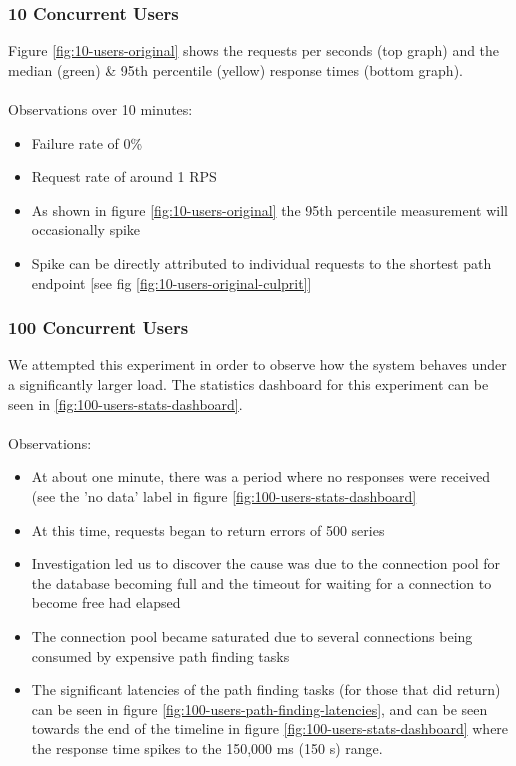 \subsubsection{10 Concurrent Users}
Figure \ref{fig:10-users-original} shows the requests per seconds (top graph) and the median (green) \& 95th percentile (yellow) response times (bottom graph). 
\\\\
Observations over 10 minutes:
\begin{itemize}
    \item Failure rate of 0\%
    \item Request rate of around 1 RPS
    \item As shown in figure \ref{fig:10-users-original} the 95th percentile measurement will occasionally spike
    \item Spike can be directly attributed to individual requests to the shortest path endpoint [see fig \ref{fig:10-users-original-culprit}]
\end{itemize}

\subsubsection{100 Concurrent Users}
We attempted this experiment in order to observe how the system behaves under a significantly larger load. The statistics dashboard for this experiment can be seen in \ref{fig:100-users-stats-dashboard}. 
\\\\
Observations:
\begin{itemize}
    \item At about one minute, there was a period where no responses were received (see the 'no data' label in figure \ref{fig:100-users-stats-dashboard}
    \item At this time, requests began to return errors of 500 series
    \item Investigation led us to discover the cause was due to the connection pool for the database becoming full and the timeout for waiting for a connection to become free had elapsed
    \item The connection pool became saturated due to several connections being consumed by expensive path finding tasks
    \item The significant latencies of the path finding tasks (for those that did return) can be seen in figure \ref{fig:100-users-path-finding-latencies}, and can be seen towards the end of the timeline in figure \ref{fig:100-users-stats-dashboard} where the response time spikes to the 150,000 ms (150 s) range. 
    
\end{itemize}

